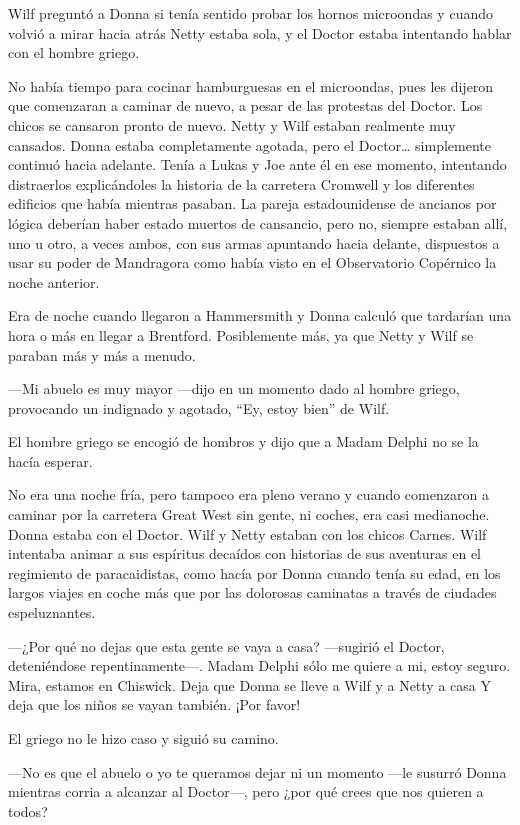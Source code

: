 Wilf preguntó a Donna si tenía sentido probar los hornos microondas y
cuando volvió a mirar hacia atrás Netty estaba sola, y el Doctor estaba
intentando hablar con el hombre griego.

No había tiempo para cocinar hamburguesas en el microondas, pues les
dijeron que comenzaran a caminar de nuevo, a pesar de las protestas del
Doctor. Los chicos se cansaron pronto de nuevo. Netty y Wilf estaban
realmente muy cansados. Donna estaba completamente agotada, pero el
Doctor\ldots{} simplemente continuó hacia adelante. Tenía a Lukas y Joe
ante él en ese momento, intentando distraerlos explicándoles la historia
de la carretera Cromwell y los diferentes edificios que había mientras
pasaban. La pareja estadounidense de ancianos por lógica deberían haber
estado muertos de cansancio, pero no, siempre estaban allí, uno u otro,
a veces ambos, con sus armas apuntando hacia delante, dispuestos a usar
su poder de Mandragora como había visto en el Observatorio Copérnico la
noche anterior.

Era de noche cuando llegaron a Hammersmith y Donna calculó que tardarían
una hora o más en llegar a Brentford. Posiblemente más, ya que Netty y
Wilf se paraban más y más a menudo.

---Mi abuelo es muy mayor ---dijo en un momento dado al hombre griego,
provocando un indignado y agotado, ``Ey, estoy bien'' de Wilf.

El hombre griego se encogió de hombros y dijo que a Madam Delphi no se
la hacía esperar.

No era una noche fría, pero tampoco era pleno verano y cuando comenzaron
a caminar por la carretera Great West sin gente, ni coches, era casi
medianoche. Donna estaba con el Doctor. Wilf y Netty estaban con los
chicos Carnes. Wilf intentaba animar a sus espíritus decaídos con
historias de sus aventuras en el regimiento de paracaidistas, como hacía
por Donna cuando tenía su edad, en los largos viajes en coche más que
por las dolorosas caminatas a través de ciudades espeluznantes.

---¿Por qué no dejas que esta gente se vaya a casa? ---sugirió el
Doctor, deteniéndose repentinamente---. Madam Delphi sólo me quiere a
mi, estoy seguro. Mira, estamos en Chiswick. Deja que Donna se lleve a
Wilf y a Netty a casa Y deja que los niños se vayan también. ¡Por
favor!

El griego no le hizo caso y siguió su camino.

---No es que el abuelo o yo te queramos dejar ni un momento ---le
susurró Donna mientras corria a alcanzar al Doctor---, pero ¿por qué
crees que nos quieren a todos?

